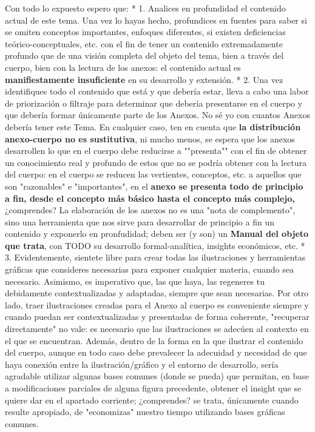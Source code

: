 \documentclass[10pt,a4paper]{article}
\newcounter{anexo}
\begin{document}
{{    Con todo lo expuesto espero que:
    * 1. Analices en profundidad el contenido actual de este tema. Una vez lo hayas hecho, profundices en fuentes para saber si se omiten conceptos importantes, enfoques diferentes, si existen deficiencias teórico-conceptuales, etc. con el fin de tener un contenido extremadamente profundo que de una visión completa del objeto del tema, bien a través del cuerpo, bien con la lectura de los anexos: el contenido actual es \textbf{manifiestamente insuficiente} en su desarrollo y extensión. 
    * 2. Una vez identifiques todo el contenido que está y que debería estar, lleva a cabo una labor de priorización o filtraje para determinar que debería presentarse en el cuerpo y que debería formar únicamente parte de los Anexos. No sé yo con cuantos Anexos debería tener este Tema.
    En cualquier caso, ten en cuenta que \textbf{la distribución anexo-cuerpo no es sustitutiva}, ni mucho menos, se espera que los anexos desarrollen lo que en el cuerpo debe reducirse a ""presenta"" con el fin de obtener un conocimiento real y profundo de estos que no se podría obtener con la lectura del cuerpo: en el cuerpo se reducen las vertientes, conceptos, etc. a aquellos que son "razonables" e "importantes", en el \textbf{anexo se presenta todo de principio a fin, desde el concepto más básico hasta el concepto más complejo,} ¿comprendes? La elaboración de los anexos no es una "nota de complemento", sino una herramienta que nos sirve para desarrollar de principio a fin un contenido y exponerlo en pronfudidad; deben ser (y son) un \textbf{Manual del objeto que trata}, con TODO su desarrollo formal-analítica, insights económicos, etc. 
    * 3. Evidentemente, sientete libre para crear todas las ilustraciones y herramientas gráficas que consideres necesarias para exponer cualquier materia, cuando sea necesario. Asimismo, es imperativo que, las que haya, las regeneres tu debidamente contextualizadas y adaptadas, siempre que sean necesarias. Por otro lado, traer ilustraciones creadas para el Anexo al cuerpo es conveniente siempre y cuando puedan ser contextualizadas y presentadas de forma coherente, "recuperar directamente" no vale: es necesario que las ilustraciones se adecúen al contexto en el que se encuentran. Además, dentro de la forma en la que ilustrar el contenido del cuerpo, aunque en todo caso debe prevalecer la adecuidad y necesidad de que haya conexión entre la ilustración/gráfico y el entorno de desarrollo, sería agradable utilizar algunas bases comunes (donde se pueda) que permitan, en base a modificaciones parciales de alguna figura precedente, obtener el insight que se quiere dar en el apartado corriente; ¿comprendes? se trata, únicamente cuando resulte apropiado, de "economizas" nuestro tiempo utilizando bases gráficas comunes.
}}
\end{document}
